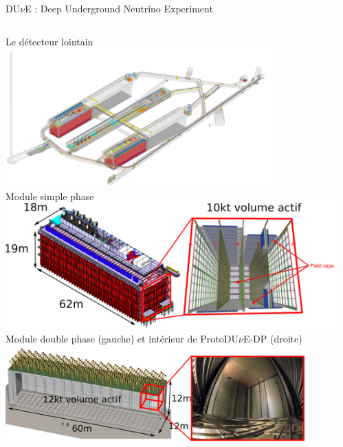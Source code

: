     \begin{frame}{DU$\nu$E : Deep Underground Neutrino Experiment}
        \begin{scriptsize}
            \begin{columns}
                \begin{column}{0.55\textwidth}
                    \centering Le détecteur lointain\\
                    \includegraphics[width=0.8\textwidth]{./pictures/FD.png}\\
                    \centering Module simple phase\\
                    \includegraphics[width=\textwidth]{./pictures/module_SP.png}\\
                    \centering Module double phase (gauche) et intérieur de ProtoDU$\nu$E-DP (droite)\\
                    \includegraphics[width=0.9\textwidth]{./pictures/module_DP.png}
                \end{column}
                \begin{column}{0.45\textwidth}

\end{column}
\end{columns}
\end{scriptsize}
\end{frame}
